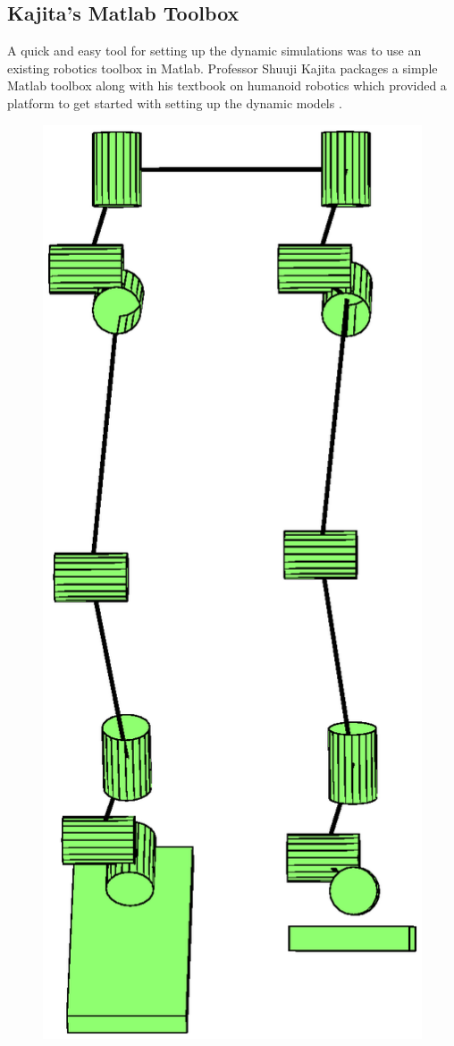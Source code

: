 
\subsection{Kajita's Matlab Toolbox} %
\label{sec:kajita_s_matlab_toolbox}
A quick and easy tool for setting up the dynamic simulations was to use an existing robotics toolbox in Matlab. Professor Shuuji Kajita packages a simple Matlab toolbox along with his textbook on humanoid robotics which provided a platform to get started with setting up the dynamic models \cite{kajitatxt}. 

\begin{figure}[!ht]
	\begin{center}
    \includegraphics[scale=0.6]{fig/ch5/ulinkdrawn.eps}

\end{center}
\end{figure}
